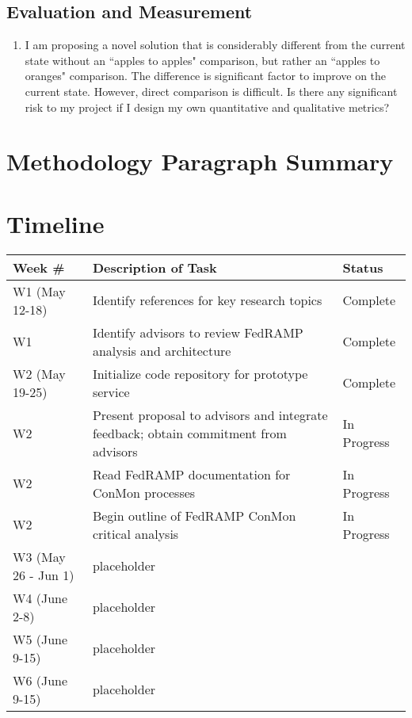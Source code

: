 \documentclass{jdf}
\begin{document}
\subsection*{Evaluation and Measurement}

\begin{enumerate}
    \item I am proposing a novel solution that is considerably different from the current state without an ``apples to apples" comparison, but rather an ``apples to oranges" comparison. The difference is significant factor to improve on the current state. However, direct comparison is difficult. Is there any significant risk to my project if I design my own quantitative and qualitative metrics?    
\end{enumerate}

\section*{Methodology Paragraph Summary}

\section*{Timeline}
\begin{table}[h]
\begin{tabularx}{\textwidth}{|l|X|l|}
    \hline
    Week \# & Description of Task & Status \\ [0.5ex] 
    \hline
    W1 (May 12-18) & Identify references for key research topics & Complete \\
    \hline
    W1 & Identify advisors to review FedRAMP analysis and architecture & Complete \\
    \hline
    W2 (May 19-25) & Initialize code repository for prototype service & Complete \\
    \hline
    W2 & Present proposal to advisors and integrate feedback; obtain commitment from advisors & In Progress \\
    \hline
    W2 & Read FedRAMP documentation for ConMon processes & In Progress \\
    \hline
    W2 & Begin outline of FedRAMP ConMon critical analysis & In Progress \\
    \hline
    W3 (May 26 - Jun 1) & placeholder \\
    \hline
    W4 (June 2-8) & placeholder \\
    \hline
    W5 (June 9-15) & placeholder \\
    \hline
    W6 (June 9-15) & placeholder \\
    \hline    
\end{tabularx}
\end{table}
\end{document}
